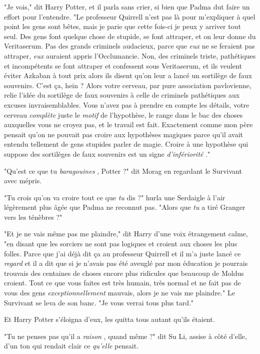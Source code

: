 "Je vois," dit Harry Potter, et il parla sans crier, si bien que Padma dut faire un effort pour l'entendre. "Le professeur Quirrell n'est pas là pour m'expliquer à quel point les gens sont bêtes, mais je parie que cette fois-ci je peux y arriver tout seul. Des gens font quelque chose de stupide, se font attraper, et on leur donne du Veritaserum. Pas des grands criminels audacieux, parce que \emph{eux}  ne se feraient pas attraper, \emph{eux}  auraient appris l'Occlumancie. Non, des criminels triste, pathétiques et incompétents se font attraper et confessent sous Veritaserum, et ils veulent éviter Azkaban à tout prix alors ils disent qu'on leur a lancé un sortilège de faux souvenirs. C'est ça, hein ? Alors votre cerveau, par pure association pavlovienne, relie l'idée du sortilège de faux souvenirs à celle de criminels pathétiques aux excuses invraisemblables. Vous n'avez pas à prendre en compte les détails, votre cerveau \emph{complète } juste le \emph{motif}  de l'hypothèse, le range dans le bac des choses auxquelles vous ne croyez pas, et le travail est fait. Exactement comme mon père pensait qu'on ne pouvait pas croire aux hypothèses magiques parce qu'il avait entendu tellement de gens stupides parler de magie. Croire à une hypothèse qui suppose des sortilèges de faux souvenirs est un signe \emph{d'infériorité} ."

"Qu'est ce que tu \emph{baragouines} , Potter ?" dit Morag en regardant le Survivant avec mépris.

"Tu crois qu'on va croire tout ce que \emph{tu}  dis ?" hurla une Serdaigle à l'air légèrement plus âgée que Padma ne reconnut pas. "Alors que \emph{tu } a tiré Granger vers les ténèbres ?"

"Et je ne vais même pas me plaindre," dit Harry d'une voix étrangement calme, "en disant que les sorciers ne sont pas logiques et croient aux choses les plus folles. Parce que j'ai déjà dit ça au professeur Quirrell et il m'a juste lancé ce \emph{regard}  et il a dit que si je n'avais pas été aveuglé par mon éducation je pourrais trouvais des centaines de choses encore plus ridicules que beaucoup de Moldus croient. Tout ce que vous faites est très humain, très normal et ne fait pas de vous des gens \emph{exceptionnellement}  mauvais, alors je ne vais me plaindre." Le Survivant se leva de son banc. "Je vous verrai tous plus tard."

Et Harry Potter s'éloigna d'eux, les quitta tous autant qu'ils étaient.

"Tu ne penses pas qu'il a \emph{raison} , quand même ?" dit Su Li, assise à côté d'elle, d'un ton qui rendait clair ce \emph{qu'elle}  pensait.

